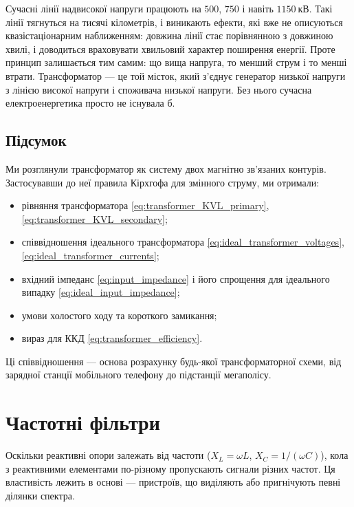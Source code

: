 \begin{Attention}
	Сучасні лінії надвисокої напруги працюють на $500$,
	$750$ і навіть $1150\ \text{кВ}$. Такі лінії тягнуться на тисячі кілометрів, і
	виникають ефекти, які вже не описуються квазістаціонарним
	наближенням: довжина лінії стає порівнянною з довжиною
	хвилі, і доводиться враховувати хвильовий характер
	поширення енергії. Проте принцип залишається тим самим:
	що вища напруга, то менший струм і то менші втрати.
	Трансформатор --- це той місток, який з'єднує генератор
	низької напруги з лінією високої напруги і споживача
	низької напруги. Без нього сучасна електроенергетика
	просто не існувала б.
\end{Attention}

\subsection*{Підсумок}

Ми розглянули трансформатор як систему двох магнітно
зв'язаних контурів. Застосувавши до неї правила Кірхгофа для
змінного струму, ми отримали:
\begin{itemize}
	\item рівняння трансформатора \eqref{eq:transformer_KVL_primary},
	\eqref{eq:transformer_KVL_secondary};
	\item співвідношення ідеального трансформатора
	\eqref{eq:ideal_transformer_voltages},
	\eqref{eq:ideal_transformer_currents};
	\item вхідний імпеданс \eqref{eq:input_impedance} і його
	спрощення для ідеального випадку
	\eqref{eq:ideal_input_impedance};
	\item умови холостого ходу та короткого замикання;
	\item вираз для ККД \eqref{eq:transformer_efficiency}.
\end{itemize}
Ці співвідношення --- основа розрахунку будь-якої
трансформаторної схеми, від зарядної станції мобільного
телефону до підстанції мегаполісу.

\section{Частотні фільтри}\hypertarget{frequency-filters}{}

Оскільки реактивні опори залежать від частоти ($X_L = \omega L$, $X_C = 1/(\omega C)$), кола з реактивними елементами по-різному пропускають сигнали різних частот. Ця властивість лежить в основі  --- пристроїв, що виділяють або пригнічують певні ділянки спектра.

